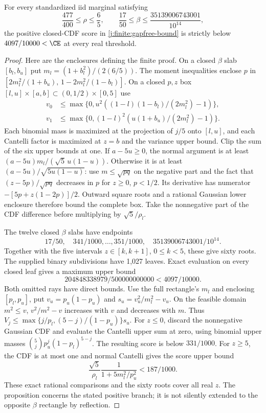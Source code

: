 \begin{proposition}
\label{j:finite:gapfree5-result}
For every standardized iid marginal satisfying
\[
 \frac{477}{400}\le\rho\le\frac65,\qquad
 \frac{17}{50}\le\beta\le\frac{35139006743001}{10^{14}},
\]
the positive closed-CDF score in \eqref{j:finite:gapfree-bound} is strictly
below $4097/10000<\CE$ at every real threshold.
\end{proposition}
\begin{proof}
Here are the enclosures defining the finite proof. On a closed
$\beta$ slab $[b_l,b_u]$ put $m_l=(1+b_l^2)/(2(6/5))$.
The moment inequalities enclose $p$ in
$[2m_l^2/(1+b_u),\,1-2m_l^2/(1-b_l)]$.
On a closed $p,z$ box $[l,u]\times[a,b]\subset(0,1/2)\times[0,5]$
use
\begin{align*}
 v_0&\le\max\{0,u^2((1-l)(1-b_l)/(2m_l^2)-1)\},\\
 v_1&\le\max\{0,(1-l)^2(u(1+b_u)/(2m_l^2)-1)\}.
\end{align*}
Each binomial mass is maximized at the projection of $j/5$ onto
$[l,u]$, and each Cantelli factor is maximized at $z=b$ and the
variance upper bound. Clip the sum of the six upper bounds at one.
If $a-5u\ge0$, the normal argument is at least
$(a-5u)m_l/(\sqrt5\,u(1-u))$.
Otherwise it is at least $(a-5u)/\sqrt{5u(1-u)}$: use
$m\le\sqrt{pq}$ on the negative part and the fact that
$(z-5p)/\sqrt{pq}$ decreases in $p$ for $z\ge0$, $p<1/2$.
Its derivative has numerator $-[5p+z(1-2p)]/2$.
Outward square roots and a rational Gaussian lower enclosure therefore
bound the complete box. Take the nonnegative part of the CDF difference
before multiplying by $\sqrt5/\rho_l$.

The twelve closed $\beta$ slabs have endpoints
\[
 17/50,\quad 341/1000,\ldots,351/1000,\quad
 35139006743001/10^{14}.
\]
Together with the five intervals $z\in[k,k+1]$, $0\le k<5$, these
give sixty roots. The supplied binary subdivisions have 1,027 leaves.
Exact evaluation on every closed leaf gives a maximum upper bound
\[
 204848338979/500000000000<4097/10000.
\]
Both omitted rays have direct bounds. Use the full rectangle's $m_l$
and enclosing $[p_l,p_u]$, put $v_u=p_u(1-p_u)$ and
$s_u=v_u^2/m_l^2-v_u$. On the feasible domain $m^2\le v$,
$v^2/m^2-v$ increases with $v$ and decreases with $m$. Thus
$V_j\le\max\{j/p_l,(5-j)/(1-p_u)\}s_u$.
For $z\le0$, discard the nonnegative Gaussian CDF and evaluate the
Cantelli upper sum at zero, using binomial upper masses
$\binom5j p_u^j(1-p_l)^{5-j}$. The resulting score is below $331/1000$.
For $z\ge5$, the CDF is at most one and normal Cantelli gives the
score upper bound
\[
 \frac{\sqrt5}{\rho_l}\frac1{1+5m_l^2/p_u^2}<187/1000.
\]
These exact rational comparisons and the sixty roots cover all real $z$.
The proposition concerns the stated positive branch; it is not silently
extended to the opposite $\beta$ rectangle by reflection.
\end{proof}

